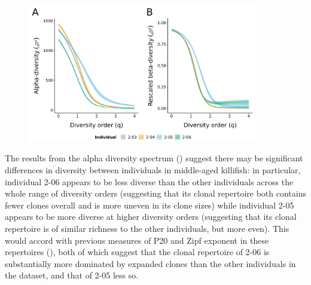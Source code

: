 \begin{figure}
\centering
\includegraphics[width = 0.9\textwidth]{_Figures/png/pilot-clone-diversity}
\begin{subfigure}{0em}
\label{fig:igseq-pilot-clone-diversity-alpha}
\end{subfigure}
\begin{subfigure}{0em}
\label{fig:igseq-pilot-clone-diversity-beta}
\end{subfigure}
\label{fig:igseq-pilot-clone-diversity}
\end{figure}

The results from the alpha diversity spectrum () suggest there may be significant differences in diversity between individuals in middle-aged killifish: in particular, individual 2-06 appears to be less diverse than the other individuals across the whole range of diversity orders (suggesting that its clonal repertoire both contains fewer clones overall and is more uneven in its clone sizes) while individual 2-05 appears to be more diverse at higher diversity orders (suggesting that its clonal repertoire is of similar richness to the other individuals, but more even). This would accord with previous measures of P20 and Zipf exponent in these repertoires (), both of which suggest that the clonal repertoire of 2-06 is substantially more dominated by expanded clones than the other individuals in the dataset, and that of 2-05 less so.

